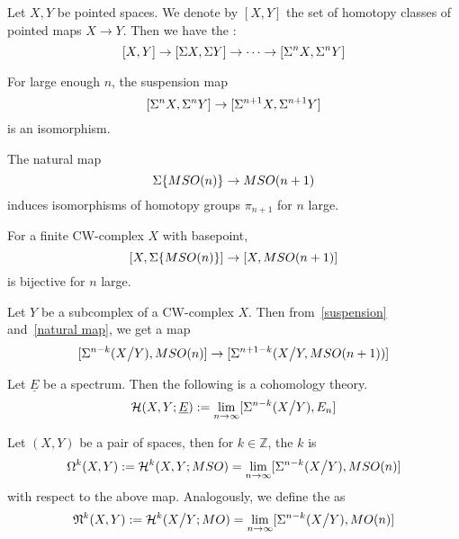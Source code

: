 \documentclass[a4paper,11pt]{article}
\begin{document}
\begin{theorem}\label{suspension}
    Let \(X, Y\) be pointed spaces. We denote by \({[X,Y]}\) the set of homotopy classes of pointed maps \(X\to Y\). Then we have the :
    \[[X,Y]\to[\Sigma{X},\Sigma{Y}]\to\dots\to[\Sigma^n{X},\Sigma^n{Y}]\] 
\end{theorem}


\begin{theorem}\label{freudenthal}
    For large enough \(n\), the suspension map
    \[[\Sigma^nX,\Sigma^nY]\to[\Sigma^{n+1}X,\Sigma^{n+1}Y]\]
    is an isomorphism.
\end{theorem}


\begin{lemma}\label{natural map}\cite{thom}
    The natural map
    \[\Sigma\{MSO(n)\}\to MSO(n+1)\]
    induces isomorphisms of homotopy groups \(\pi_{n+1}\) for \(n\) large.
\end{lemma}

\begin{corollary}
    For a finite CW-complex \(X\) with basepoint, \[[X,\Sigma\{MSO(n)\}]\to[X,MSO(n+1)]\] is bijective for \(n\) large.
\end{corollary}

\begin{lemma}
    Let \(Y\) be a subcomplex of a CW-complex \(X\). Then from\ \ref{suspension} and\ \ref{natural map}, we get a map
    \[[\Sigma^{n-k}(X\big/ Y),MSO(n)]\to[\Sigma^{n+1-k}(X\big/Y, MSO(n+1))]\]
\end{lemma}

\begin{definition}
    
\end{definition}

\begin{theorem}\label{spectrum cohomology}
    Let \(\underline{E}\) be a spectrum. Then the following is a cohomology theory.
    \[\mathcal{H}(X,Y;\underline{E}):=\lim_{n\to\infty}[\Sigma^{n-k}(X\big/Y),E_n]\]
\end{theorem}

\begin{definition}
    Let \((X,Y)\) be a pair of spaces, then for \(k\in\mathbb{Z}\), the \(k\) is
    \[\Omega^k(X,Y):=\mathcal{H}^k(X,Y;MSO)=\lim_{n\to\infty}[\Sigma^{n-k}(X\big/Y),MSO(n)]\]
    with respect to the above map.
    Analogously, we define the  as
    \[\mathfrak{N}^k(X,Y):= \mathcal{H}^k(X\big/Y;MO)=\lim_{n\to\infty}[\Sigma^{n-k}(X\big/ Y),MO(n)]\]
\end{definition}
\end{document}
